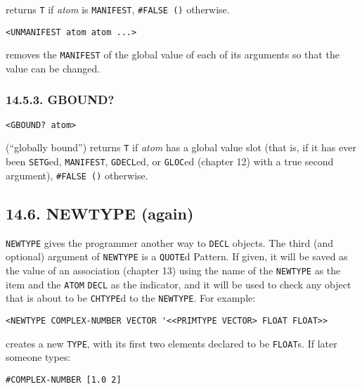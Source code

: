 \documentclass[a4paper,]{article}
\begin{document}
 returns \texttt{T} if \emph{atom} is \texttt{MANIFEST}, \texttt{\#FALSE\ ()} otherwise.

\begin{verbatim}
<UNMANIFEST atom atom ...>
\end{verbatim}

 removes the \texttt{MANIFEST} of the global value of each of its arguments so that the
value can be changed.

\subsubsection{14.5.3. GBOUND?}\label{gbound}

\begin{verbatim}
<GBOUND? atom>
\end{verbatim}

 (``globally bound'') returns \texttt{T} if \emph{atom} has a global value slot (that is, if
it has ever been \texttt{SETG}ed, \texttt{MANIFEST}, \texttt{GDECL}ed, or \texttt{GLOC}ed (chapter 12) with a true second
argument), \texttt{\#FALSE\ ()} otherwise.

\subsection{14.6. NEWTYPE (again)}\label{newtype-again}

 \texttt{NEWTYPE} gives the programmer another way to \texttt{DECL} objects. The third (and
optional) argument of \texttt{NEWTYPE} is a \texttt{QUOTE}d Pattern. If given, it will be saved as the value of an
association (chapter 13) using the name of the \texttt{NEWTYPE} as the item and the \texttt{ATOM} \texttt{DECL} as the
indicator, and it will be used to check any object that is about to be \texttt{CHTYPE}d to the \texttt{NEWTYPE}. For
example:

\begin{verbatim}
<NEWTYPE COMPLEX-NUMBER VECTOR '<<PRIMTYPE VECTOR> FLOAT FLOAT>>
\end{verbatim}

creates a new \texttt{TYPE}, with its first two elements declared to be \texttt{FLOAT}s. If later someone types:

\begin{verbatim}
#COMPLEX-NUMBER [1.0 2]
\end{verbatim}
\end{document}
